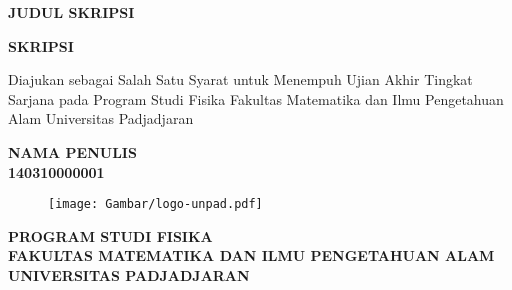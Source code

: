 \begin{titlepage}
    \thispagestyle{empty}
    \begin{center}
        \begin{large}\begin{spacing}{1}
                \textbf{JUDUL SKRIPSI}
            \end{spacing}\end{large}

        \vspace{4cm}
        \textbf{SKRIPSI}

        \vspace{1cm}
        Diajukan sebagai Salah Satu Syarat untuk Menempuh Ujian Akhir Tingkat Sarjana pada Program Studi Fisika Fakultas Matematika dan Ilmu Pengetahuan Alam Universitas Padjadjaran

        \vspace{1cm}
        \textbf{NAMA PENULIS\\
            140310000001}

        \vspace{2cm}
        \begin{figure}[h]
            \centering
            \texttt{[image: Gambar/logo-unpad.pdf]}
            \label{fig:unpadlogo}
        \end{figure}

        \vspace{2cm}
        \textbf{PROGRAM STUDI FISIKA\\
            FAKULTAS MATEMATIKA DAN ILMU PENGETAHUAN ALAM\\
            UNIVERSITAS PADJADJARAN\\}

        \vspace{\baselineskip}
        \textbf{\large \the\year{}}
    \end{center}
\end{titlepage}